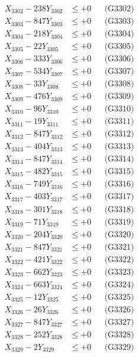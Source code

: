 \documentclass[a4paper,10pt]{article}
\begin{document}
{\begin{align}
X_{3302} - 238Y_{3302} &\leq +0 && \text{(G3302)} \\
X_{3303} - 847Y_{3303} &\leq +0 && \text{(G3303)} \\
X_{3304} - 218Y_{3304} &\leq +0 && \text{(G3304)} \\
X_{3305} - 22Y_{3305} &\leq +0 && \text{(G3305)} \\
X_{3306} - 333Y_{3306} &\leq +0 && \text{(G3306)} \\
X_{3307} - 534Y_{3307} &\leq +0 && \text{(G3307)} \\
X_{3308} - 33Y_{3308} &\leq +0 && \text{(G3308)} \\
X_{3309} - 476Y_{3309} &\leq +0 && \text{(G3309)} \\
X_{3310} - 96Y_{3310} &\leq +0 && \text{(G3310)} \\
\allowbreak
X_{3311} - 19Y_{3311} &\leq +0 && \text{(G3311)} \\
X_{3312} - 847Y_{3312} &\leq +0 && \text{(G3312)} \\
X_{3313} - 404Y_{3313} &\leq +0 && \text{(G3313)} \\
X_{3314} - 847Y_{3314} &\leq +0 && \text{(G3314)} \\
X_{3315} - 482Y_{3315} &\leq +0 && \text{(G3315)} \\
X_{3316} - 749Y_{3316} &\leq +0 && \text{(G3316)} \\
X_{3317} - 403Y_{3317} &\leq +0 && \text{(G3317)} \\
X_{3318} - 301Y_{3318} &\leq +0 && \text{(G3318)} \\
X_{3319} - 71Y_{3319} &\leq +0 && \text{(G3319)} \\
X_{3320} - 204Y_{3320} &\leq +0 && \text{(G3320)} \\
\allowbreak
X_{3321} - 847Y_{3321} &\leq +0 && \text{(G3321)} \\
X_{3322} - 421Y_{3322} &\leq +0 && \text{(G3322)} \\
X_{3323} - 662Y_{3323} &\leq +0 && \text{(G3323)} \\
X_{3324} - 663Y_{3324} &\leq +0 && \text{(G3324)} \\
X_{3325} - 12Y_{3325} &\leq +0 && \text{(G3325)} \\
X_{3326} - 26Y_{3326} &\leq +0 && \text{(G3326)} \\
X_{3327} - 847Y_{3327} &\leq +0 && \text{(G3327)} \\
X_{3328} - 252Y_{3328} &\leq +0 && \text{(G3328)} \\
X_{3329} - 2Y_{3329} &\leq +0 && \text{(G3329)} \\

\end{align}}
\end{document}
